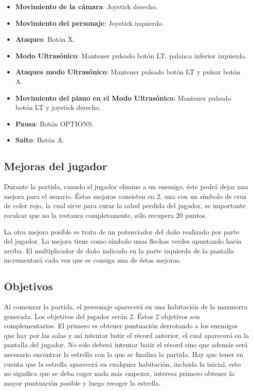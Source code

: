 \begin{itemize}    
    \item \textbf{Movimiento de la cámara}:  Joystick derecho.
    \item \textbf{Movimiento del personaje}:  Joystick izquierdo.
    \item \textbf{Ataques}: Botón X.
    \item \textbf{Modo Ultrasónico}: Mantener pulsado botón LT, palanca inferior izquierda.
    \item \textbf{Ataques modo Ultrasónico}: Mantener pulsado botón LT y pulsar botón A.
    \item \textbf{Movimiento del plano en el Modo Ultrasónico}: Mantener pulsado botón LT y joystick derecho.
    \item \textbf{Pausa}: Botón OPTIONS.
    \item \textbf{Salto}: Botón A.
\end{itemize}

\subsection{Mejoras del jugador}

Durante la partida, cuando el jugador elimine a un enemigo, éste podrá dejar una mejora para el usuario. Éstas mejoras consisten en 2, una con un símbolo de cruz de color rojo, la cual sirve para curar la salud perdida del jugador, es importante recalcar que no la restaura completamente, sólo recupera 20 puntos. 

La otra mejora posible se trata de un potenciador del daño realizado por parte del jugador. La mejora tiene como símbolo unas flechas verdes apuntando hacia arriba. El multiplicador de daño indicado en la parte izquierda de la pantalla incrementará cada vez que se consiga una de éstas mejoras.

\subsection{Objetivos}

Al comenzar la partida, el personaje aparecerá en una habitación de la mazmorra generada. Los objetivos del jugador serán 2. Éstos 2 objetivos son complementarios. El primero es obtener puntuación derrotando a los enemigos que hay por las salas y así intentar batir el récord anterior, el cual aparecerá en la pantalla del jugador. No solo deberá intentar batir el récord sino que además será necesario encontrar la estrella con la que se finaliza la partida. Hay que tener en cuenta que la estrella aparecerá en cualquier habitación, incluida la inicial, esto no significa que se deba coger nada más empezar, interesa primero obtener la mayor puntuación posible y luego recoger la estrella.

